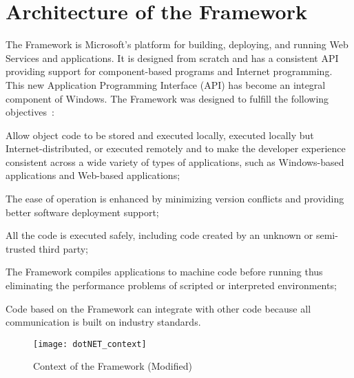 \section{Architecture of the \dotNET Framework}
\label{sec:OverviewDotNetArchitecture}
The \dotNET Framework is Microsoft's platform for building, deploying, and running Web Services and applications. It is designed from scratch and has a consistent API providing support for component-based programs and Internet programming.
This new Application Programming Interface (API) has become an integral component of Windows. The \dotNET Framework was designed to fulfill the following objectives~\cite{Microsoft03-1}:

\begin{description}[noitemsep, style=nextline]
  \item[Consistency] Allow object code to be stored and executed locally, executed locally but Internet-distributed, or executed remotely and to make the developer experience consistent across a wide variety of types of applications, such as Windows-based applications and Web-based applications;
  \item[Operability] The ease of operation is enhanced by minimizing version conflicts and providing better software deployment support;
  \item[Security] All the code is executed safely, including code created by an unknown or semi-trusted third party;
  \item[Efficiency] The \dotNET Framework compiles applications to machine code before running thus eliminating the performance problems of scripted or interpreted environments;
  \item[Interoperability] Code based on the \dotNET Framework can integrate with other code because all communication is built on industry standards.
\end{description}

\begin{figure}
 \centering
 \texttt{[image: dotNET\_context]}
 \caption[Context of the \dotNET framework]{Context of the \dotNET Framework (Modified)~\cite{Microsoft03-1}}
 \label{fig:dotNET_context}
\end{figure}

